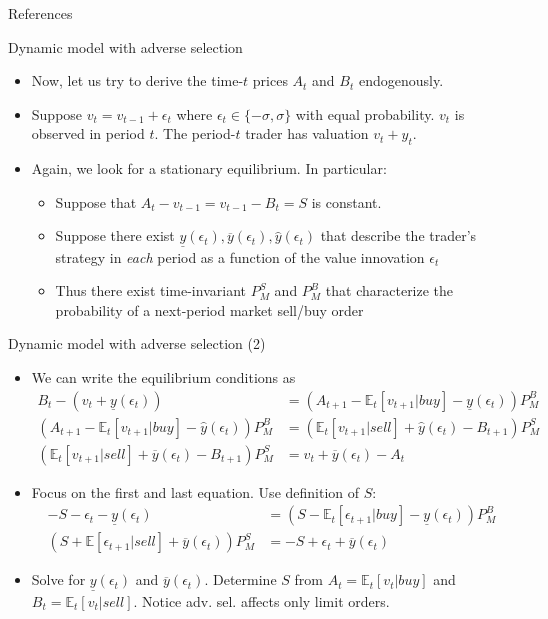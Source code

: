 \documentclass[english,10pt]{beamer}
\begin{document}
\appendix
\begin{frame}[allowframebreaks]{References}


\end{frame}


\begin{frame}[label=adverse]{Dynamic model with adverse selection}
	\begin{itemize}
		\item Now, let us try to derive the time-$t$ prices $A_t$ and $B_t$ endogenously. 
		\item Suppose $v_t=v_{t-1}+\epsilon_t$ where $\epsilon_t \in \{-\sigma, \sigma \}$ with equal probability. $v_t$ is observed in period $t$. The period-$t$ trader has valuation $v_t+y_t$. 
		\item Again, we look for a stationary equilibrium. In particular:
		\begin{itemize}
			\item Suppose that $A_t-v_{t-1}=v_{t-1}-B_t=S$ is constant.
			\item Suppose there exist $\underline{y}(\epsilon_t),\overline{y}(\epsilon_t),\hat{y}(\epsilon_t)$  that describe the trader's strategy in \textit{each} period  as a function of the value innovation $\epsilon_t$ 
			\item Thus there exist time-invariant $P^S_M$ and $P^B_M$ that characterize the probability of a next-period market sell/buy order 
		\end{itemize}
	\end{itemize}
\end{frame}


\begin{frame}{Dynamic model with adverse selection (2)}
	\begin{itemize}
		\item We can write the equilibrium conditions as
		\begin{align*}
		B_t-(v_t+\underline{y}(\epsilon_t)) 					& = (A_{t+1}-\mathbb{E}_t[v_{t+1}|buy]-\underline{y}(\epsilon_t) 	)P^B_M \\
		(A_{t+1}-\mathbb{E}_t[v_{t+1}|buy]-\hat{y}(\epsilon_t))P^B_M 			& = (\mathbb{E}_t[v_{t+1}|sell]+\hat{y}(\epsilon_t)-B_{t+1})P^S_M  \\
		(\mathbb{E}_t[v_{t+1}|sell]+\overline{y}(\epsilon_t)-B_{t+1}) P^S_M  	& = v_t+\overline{y}(\epsilon_t)-A_t 
		\end{align*}
		\item Focus on the first and last equation. Use definition of $S$:
		\begin{align*}
		-S-\epsilon_t-\underline{y}(\epsilon_t) 					& = (S-\mathbb{E}_t[\epsilon_{t+1}|buy]-\underline{y}(\epsilon_t) 	)P^B_M \\
		(S+\mathbb{E}[\epsilon_{t+1}|sell]+\overline{y}(\epsilon_t)) P^S_M  	& =-S+\epsilon_t+\overline{y}(\epsilon_t)
		\end{align*}
		\item Solve for $\underline{y}(\epsilon_t)$ and $\overline{y}(\epsilon_t)$. Determine $S$ from $A_t=\mathbb{E}_t[v_t|buy]$ and $B_t= \mathbb{E}_t[v_t|sell]$. Notice adv. sel. affects only limit orders. \hyperlink{adverseorg}{}
	\end{itemize}
\end{frame}
\end{document}
